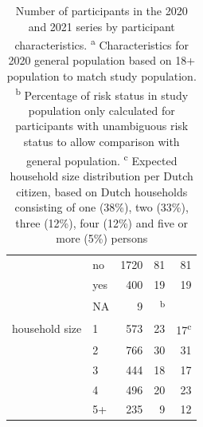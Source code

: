 \documentclass[fleqn,10pt]{wlscirep}
\begin{document}
\begin{table}[ht]
\begin{tabular}{llrrr}
   & no & 1720 & 81 & 81 \\ 
   & yes & 400 & 19 & 19 \\ 
   & NA & 9 & \textsuperscript{b} &  \\ 
  \hline
  household size & 1 & 573 & 23 & 17\textsuperscript{c} \\ 
   & 2 & 766 & 30 & 31 \\ 
   & 3 & 444 & 18 & 17 \\ 
   & 4 & 496 & 20 & 23 \\ 
   & 5+ & 235 & 9 & 12 \\ 
  \hline
  \hline
\end{tabular}
\caption{\label{tab:part}Number of participants in the 2020 and 2021 series by participant characteristics.
 \protect\linebreak \textsuperscript{a} Characteristics for 2020 general population based on 18+ population to match study population.
 \protect\linebreak \textsuperscript{b} Percentage of risk status in study population only calculated for participants with unambiguous risk status to allow comparison with general population.
\protect\linebreak \textsuperscript{c} Expected household size distribution per Dutch citizen, based on Dutch households consisting of one (38\%), two (33\%), three (12\%), four (12\%) and five or more (5\%) persons \cite{Backer_2021}}
\end{table}



\clearpage
\end{document}
